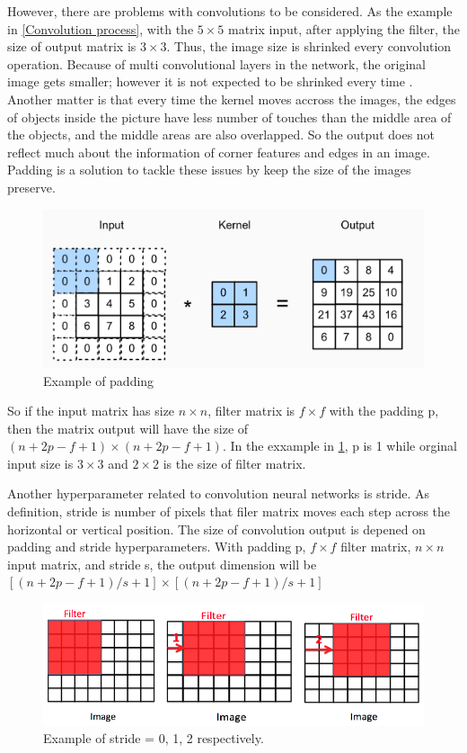\documentclass[a4paper, 12pt]{article}
\begin{document}
However, there are problems with convolutions to be considered. As the example in \ref*{Convolution process}, with the $5 \times 5$ matrix input, after applying the filter, the size of output matrix is $3 \times 3$. Thus, the image size is shrinked every convolution operation. Because of multi convolutional layers in the network, the original image gets smaller; however it is not expected to be shrinked every time \citep{szegedy2015going}. Another matter is that every time the kernel moves accross the images, the edges of objects inside the picture have less number of touches than the middle area of the objects, and the middle areas are also overlapped. So the output does not reflect much about the information of corner features and edges in an image. Padding is a solution to tackle these issues by keep the size of the images preserve.

\begin{figure}[H]
    \centering
    \includegraphics[width=\textwidth]{padding.png}
    \caption{Example of padding}
    \label{Padding}
\end{figure}

So if the input matrix has size $n \times n$, filter matrix is $f \times f$ with the padding p, then the matrix output will have the size of $(n + 2p - f + 1) \times (n + 2p -f + 1)$. In the exxample in \ref{Padding}, p is 1 while orginal input size is $3 \times 3$ and $2 \times 2$ is the size of filter matrix.

Another hyperparameter related to convolution neural networks is stride. As definition, stride is number of pixels that filer matrix moves each step across the horizontal or vertical  position. The size of convolution output is depened on padding and stride hyperparameters. With padding p, $f \times f$ filter matrix, $n \times n$ input matrix, and stride s, the output dimension will be $[{(n + 2p - f + 1) / s } + 1] \times [{(n + 2p - f + 1) / s } + 1]$

\begin{figure}[H]
    \centering
    \includegraphics[width=\textwidth]{stride.png}
    \caption{Example of stride = 0, 1, 2 respectively.}
\end{figure}
\end{document}
